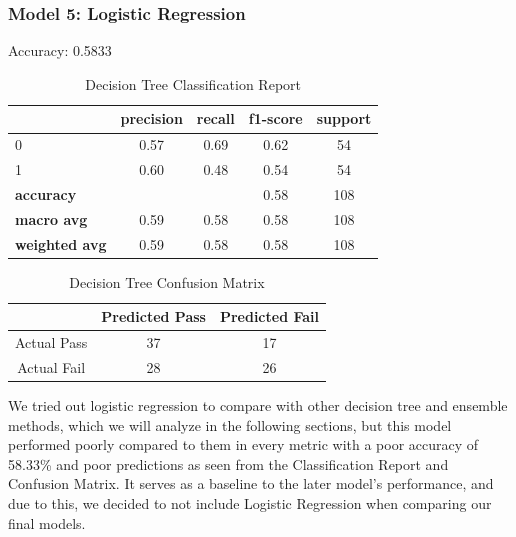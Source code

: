 \documentclass[11pt,a4paper]{article}
\begin{document}
\subsubsection{Model 5: Logistic Regression}
Accuracy: 0.5833
\begin{table}[H]
    \centering
    \begin{tabular}{lcccc}
        \hline
        & \textbf{precision} & \textbf{recall} & \textbf{f1-score} & \textbf{support} \\
        \hline
        0 & 0.57 & 0.69 & 0.62 & 54 \\
        1 & 0.60 & 0.48 & 0.54 & 54 \\
        \hline
        \textbf{accuracy} & & & 0.58 & 108 \\
        \textbf{macro avg} & 0.59 & 0.58 & 0.58 & 108 \\
        \textbf{weighted avg} & 0.59 & 0.58 & 0.58 & 108 \\
        \hline
    \end{tabular}
    \caption{Decision Tree Classification Report}
    \label{tab:lrclassification_report}
\end{table}
\begin{table}[H]
    \centering
    \begin{tabular}{|c|c|c|}
        \hline
        & Predicted Pass & Predicted Fail \\ \hline
        Actual Pass & 37 & 17 \\ \hline
        Actual Fail& 28 & 26 \\ \hline
    \end{tabular}
    \caption{Decision Tree Confusion Matrix}
    \label{tab:lrconfusion_matrix}
\end{table}

We tried out logistic regression to compare with other decision tree and ensemble methods, which we will analyze in the following sections, but this model performed poorly compared to them in every metric with a poor accuracy of 58.33\% and poor predictions as seen from the Classification Report and Confusion Matrix. It serves as a baseline to the later model's performance, and due to this, we decided to not include Logistic Regression when comparing our final models.

\end{document}
